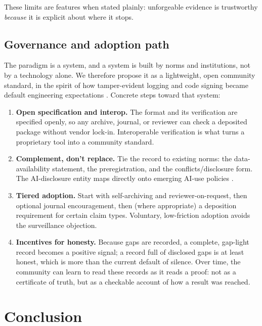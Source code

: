 \documentclass[11pt]{article}
\begin{document}
These limits are features when stated plainly: unforgeable evidence is trustworthy
\emph{because} it is explicit about where it stops.

\subsection{Governance and adoption path}

The paradigm is a system, and a system is built by norms and institutions, not by a
technology alone. We therefore propose it as a lightweight, open community standard, in
the spirit of how tamper-evident logging and code signing became default engineering
expectations \parencite{crosby2009}. Concrete steps toward that system:

\begin{enumerate}
  \item \textbf{Open specification and interop.} The format and its verification are
        specified openly, so any archive, journal, or reviewer can check a deposited
        package without vendor lock-in. Interoperable verification is what turns a
        proprietary tool into a community standard.
  \item \textbf{Complement, don't replace.} Tie the record to existing norms: the
        data-availability statement, the preregistration, and the conflicts/disclosure
        form. The AI-disclosure entity maps directly onto emerging AI-use policies
        \parencite{cope2023}.
  \item \textbf{Tiered adoption.} Start with self-archiving and reviewer-on-request,
        then optional journal encouragement, then (where appropriate) a deposition
        requirement for certain claim types. Voluntary, low-friction adoption avoids the
        surveillance objection.
  \item \textbf{Incentives for honesty.} Because gaps are recorded, a complete,
        gap-light record becomes a positive signal; a record full of disclosed gaps is
        at least honest, which is more than the current default of silence. Over time,
        the community can learn to read these records as it reads a proof: not as a
        certificate of truth, but as a checkable account of how a result was reached.
\end{enumerate}

\section{Conclusion}
\label{sec:conclusion}
\end{document}
